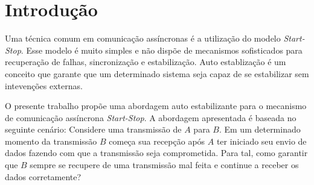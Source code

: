
\section{Introdução}

Uma técnica comum em comunicação assíncronas é a utilização do modelo 
\emph{Start-Stop}. 
Esse modelo é muito simples e não dispõe de mecanismos sofisticados para 
recuperação de falhas, sincronização e estabilização. 
Auto establização é um conceito que garante que um determinado sistema 
seja capaz de se estabilizar sem intevenções externas. 

O presente trabalho propõe uma abordagem auto estabilizante para o 
mecanismo de comunicação assíncrona \emph{Start-Stop}. 
A abordagem apresentada é baseada no seguinte cenário: Considere uma 
transmissão de $A$ para $B$. 
Em um determinado momento da transmissão $B$ começa sua recepção após
$A$ ter iniciado seu envio de dados fazendo com que a transmissão seja
comprometida.
Para tal, como garantir que $B$ sempre se recupere de uma transmissão 
mal feita e continue a receber os dados corretamente?
